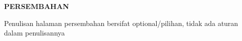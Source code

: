 \cleardoublepage
\centerline{\large\bfseries PERSEMBAHAN}
{}
\vspace*{40pt}

Penulisan halaman persembahan bersifat optional/pilihan, tidak ada aturan dalam penulisannya
